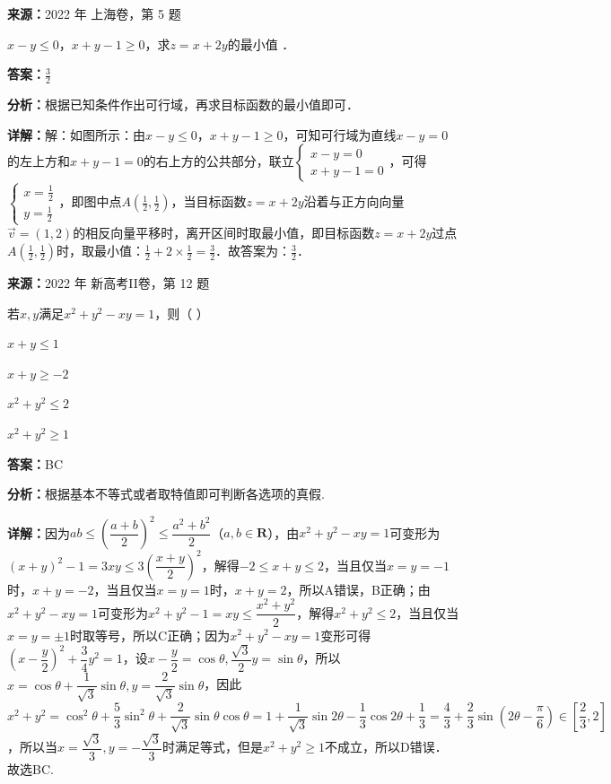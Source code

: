 \begin{question}[points=4]
\textbf{来源：}2022 年 上海卷，第 5 题\par
$x-y\leq 0$，$x+y-1\geq 0$，求$z=x+2y$的最小值 ．
\fillin[{$\frac{3}{2}$}]
\begin{solution}
\textbf{答案：}$\frac{3}{2}$

\textbf{分析：}根据已知条件作出可行域，再求目标函数的最小值即可．

\textbf{详解：}解：如图所示：由$x-y\leq 0$，$x+y-1\geq 0$，可知可行域为直线$x-y=0$的左上方和$x+y-1=0$的右上方的公共部分，联立$\begin{cases}x-y=0\\x+y-1=0\end{cases}$，可得$\begin{cases}x=\frac{1}{2}\\y=\frac{1}{2}\end{cases}$，即图中点$A\left(\frac{1}{2},\frac{1}{2}\right)$，当目标函数$z=x+2y$沿着与正方向向量$\vec{v}=(1,2)$的相反向量平移时，离开区间时取最小值，即目标函数$z=x+2y$过点$A\left(\frac{1}{2},\frac{1}{2}\right)$时，取最小值：$\frac{1}{2}+2\times\frac{1}{2}=\frac{3}{2}$．故答案为：$\frac{3}{2}$．
\end{solution}
\end{question}

\begin{question}[points=5]
\textbf{来源：}2022 年 新高考II卷，第 12 题\par
若$x,y$满足$x^2+y^2-xy=1$，则（ ）
\begin{choices}
  \item $x+y\leq 1$
  \item $x+y\geq -2$
  \item $x^2+y^2\leq 2$
  \item $x^2+y^2\geq 1$
\end{choices}
\begin{solution}
\textbf{答案：}BC

\textbf{分析：}根据基本不等式或者取特值即可判断各选项的真假.

\textbf{详解：}因为$ab\leq\left(\dfrac{a+b}{2}\right)^2\leq\dfrac{a^2+b^2}{2}$（$a,b\in\mathbf{R}$），由$x^2+y^2-xy=1$可变形为$(x+y)^2-1=3xy\leq 3\left(\dfrac{x+y}{2}\right)^2$，解得$-2\leq x+y\leq 2$，当且仅当$x=y=-1$时，$x+y=-2$，当且仅当$x=y=1$时，$x+y=2$，所以A错误，B正确；由$x^2+y^2-xy=1$可变形为$x^2+y^2-1=xy\leq\dfrac{x^2+y^2}{2}$，解得$x^2+y^2\leq 2$，当且仅当$x=y=\pm1$时取等号，所以C正确；因为$x^2+y^2-xy=1$变形可得$\left(x-\dfrac{y}{2}\right)^2+\dfrac{3}{4}y^2=1$，设$x-\dfrac{y}{2}=\cos\theta,\dfrac{\sqrt{3}}{2}y=\sin\theta$，所以$x=\cos\theta+\dfrac{1}{\sqrt{3}}\sin\theta,y=\dfrac{2}{\sqrt{3}}\sin\theta$，因此$x^2+y^2=\cos^2\theta+\dfrac{5}{3}\sin^2\theta+\dfrac{2}{\sqrt{3}}\sin\theta\cos\theta=1+\dfrac{1}{\sqrt{3}}\sin2\theta-\dfrac{1}{3}\cos2\theta+\dfrac{1}{3}=\dfrac{4}{3}+\dfrac{2}{3}\sin\left(2\theta-\dfrac{\pi}{6}\right)\in\left[\dfrac{2}{3},2\right]$，所以当$x=\dfrac{\sqrt{3}}{3},y=-\dfrac{\sqrt{3}}{3}$时满足等式，但是$x^2+y^2\geq 1$不成立，所以D错误．故选BC.
\end{solution}
\end{question}

